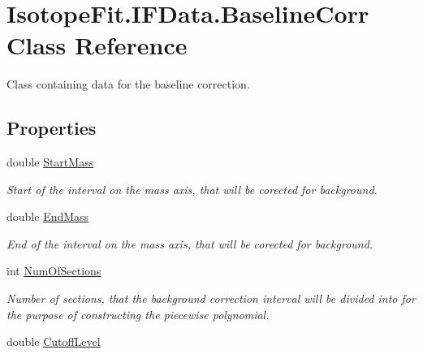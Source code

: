 \hypertarget{class_isotope_fit_1_1_i_f_data_1_1_baseline_corr}{}\section{Isotope\+Fit.\+I\+F\+Data.\+Baseline\+Corr Class Reference}
\label{class_isotope_fit_1_1_i_f_data_1_1_baseline_corr}


Class containing data for the baseline correction.  


\subsection*{Properties}
\begin{DoxyCompactItemize}
\item 
double \hyperlink{class_isotope_fit_1_1_i_f_data_1_1_baseline_corr_a9c464d39ab74e62c887b450002256902}{Start\+Mass}
\begin{DoxyCompactList}\small\item\em Start of the interval on the mass axis, that will be corected for background. \end{DoxyCompactList}\item 
double \hyperlink{class_isotope_fit_1_1_i_f_data_1_1_baseline_corr_a3ddf6fd1df96bc69336b4b6822ad7e4f}{End\+Mass}
\begin{DoxyCompactList}\small\item\em End of the interval on the mass axis, that will be corected for background. \end{DoxyCompactList}\item 
int \hyperlink{class_isotope_fit_1_1_i_f_data_1_1_baseline_corr_a61f4eeb14295a1d2ba1b80dd36163505}{Num\+Of\+Sections}
\begin{DoxyCompactList}\small\item\em Number of sections, that the background correction interval will be divided into for the purpose of constructing the piecewise polynomial. \end{DoxyCompactList}\item 
double \hyperlink{class_isotope_fit_1_1_i_f_data_1_1_baseline_corr_a74196174b782a5c1b7a7f4377b0ff451}{Cutoff\+Level}

\end{DoxyCompactItemize}
